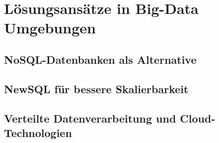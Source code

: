 \section{Lösungsansätze in Big-Data Umgebungen}

\subsection{NoSQL-Datenbanken als Alternative}

\subsection{NewSQL für bessere Skalierbarkeit}

\subsection{Verteilte Datenverarbeitung und Cloud-Technologien}